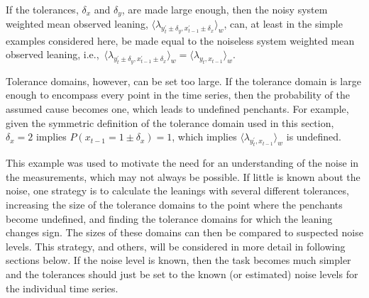 \documentclass[twocolumn,aps,pre,groupedaddress]{revtex4-1}
\begin{document}
If the tolerances, $\delta_x$ and $\delta_y$, are made large enough, then the noisy system weighted mean observed leaning, $\langle \lambda_{y_t^\prime\pm\delta_y,x_{t-1}^\prime\pm\delta_x} \rangle_w$, can, at least in the simple examples considered here, be made equal to the noiseless system weighted mean observed leaning, i.e.,\ $\langle \lambda_{y_t^\prime\pm\delta_y,x_{t-1}^\prime\pm\delta_x} \rangle_w = \langle \lambda_{y_t,x_{t-1}} \rangle_w$.

Tolerance domains, however, can be set too large.  If the tolerance domain is large enough to encompass every point in the time series, then the probability of the assumed cause becomes one, which leads to undefined penchants.  For example, given the symmetric definition of the tolerance domain used in this section, $\delta_x = 2$ implies $P(x_{t-1} = 1\pm\delta_x) = 1$, which implies $\langle \lambda_{y_t^\prime,x_{t-1}} \rangle_w$ is undefined.

This example was used to motivate the need for an understanding of the noise in the measurements, which may not always be possible.  If little is known about the noise, one strategy is to calculate the leanings with several different tolerances, increasing the size of the tolerance domains to the point where the penchants become undefined, and finding the tolerance domains for which the leaning changes sign.  The sizes of these domains can then be compared to suspected noise levels.  This strategy, and others, will be considered in more detail in following sections below.  If the noise level is known, then the task becomes much simpler and the tolerances should just be set to the known (or estimated) noise levels for the individual time series.
\end{document}
